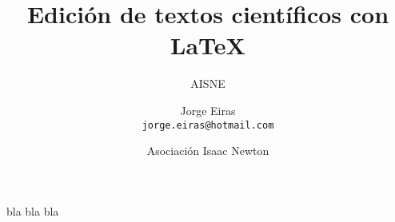 \documentclass{beamer}
\title{Edición de textos científicos con \LaTeX}
\author{AISNE}
\author[Jorge Eiras]{Jorge Eiras \\ \texttt{jorge.eiras@hotmail.com}}
\date{Asociación Isaac Newton}
\begin{document}
\justify

\begin{frame}
  \titlepage
\end{frame}

\begin{frame}
bla bla bla
\end{frame}
\end{document}
